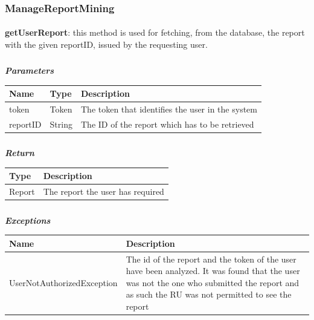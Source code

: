 				\subsubsection{ManageReportMining}
					\paragraph{}
							\textbf{getUserReport}: this method is used for fetching, from the database, the report with the given reportID, issued by the requesting user.
							\subparagraph{}
							\vspace{-3mm}
							\textcolor{myBlue}{\textit{\textbf{Parameters}}}
							\vspace{-2mm}
								\begin{table}[!h]
									\begin{tabular}{L{0.15\textwidth}L{0.15\textwidth}L{0.58\textwidth}}
										\toprule
										\textbf{Name} & \textbf{Type} & \textbf{Description} \\
										\midrule
								  		token & Token & The token that identifies the user in the system \\
								  		reportID & String & The ID of the report which has to be retrieved \\
								 		\bottomrule
									\end{tabular}
								\end{table}
							\subparagraph{}
							\vspace{-6mm}
								\textcolor{myGreen}{\textit{\textbf{Return}}}
								\vspace{-2mm}
									\begin{table}[!h]
									\begin{tabular}{L{0.15\textwidth}L{0.77\textwidth}}
										\toprule
										\textbf{Type} & \textbf{Description} \\
										\midrule
								  		Report & The report the user has required \\
								 		\bottomrule
									\end{tabular}
								\end{table}
							\subparagraph{}
							\vspace{-6mm}
								\textcolor{myRed}{\textit{\textbf{Exceptions}}}
								\vspace{-2mm}
									\begin{table}[!h]
									\begin{tabular}{L{0.4\textwidth}L{0.52\textwidth}}
										\toprule
										\textbf{Name} & \textbf{Description} \\
										\midrule
								  	UserNotAuthorizedException & The id of the report and the token of the user have been analyzed. It was found that the user was not the one who submitted the report and as such the RU was not permitted to see the report  \\
								 		\bottomrule
									\end{tabular}
								\end{table}
								
